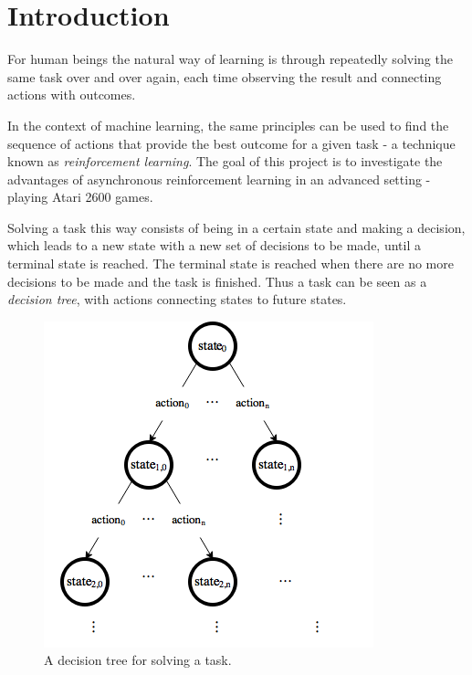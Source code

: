 \documentclass[11pt]{article}
\begin{document}
\maketitle

\section{Introduction}

For human beings the natural way of learning is through repeatedly solving the same
task over and over again, each time observing the result and connecting
actions with outcomes.

In the context of machine learning, the same principles can be used to find the
sequence of actions that provide the best outcome for a given task
- a technique known as \textit{reinforcement learning}.
The goal of this project is to investigate the advantages of asynchronous reinforcement
learning in an advanced setting - playing Atari 2600 games\cite{openAIEnvs}.

Solving a task this way consists of being in a certain state and making a decision,
which leads to a new state with a new set of decisions to be made, until
a terminal state is reached.
The terminal state is reached when there are no more decisions to be made
and the task is finished.
Thus a task can be seen as a \textit{decision tree}, with actions connecting states to future states.
\begin{figure}[H]
    \centering
    \includegraphics[scale=0.5]{include/decision_tree.png}
    \caption{A decision tree for solving a task.}
    \label{fig:dec_tree}
\end{figure}
\end{document}
